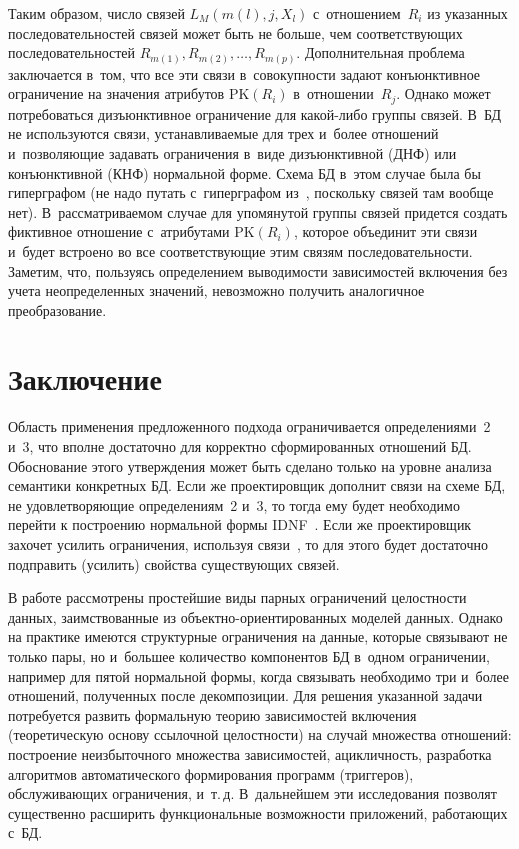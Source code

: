 \begin{multicols}{2}
  Таким образом, число связей $L_M(m(l),j,X_l)$ с~отношением~$R_i$ из
указанных последовательностей связей может быть не больше, чем
соответствующих последовательностей $R_{m(1)}, R_{m(2)}, \ldots, R_{m(p)}$.
Дополнительная проблема заключается в~том, что все эти связи в~совокупности
задают конъюнктивное ограничение на значения атрибутов $\mathrm{PK}(R_i)$ 
в~отношении~$R_j$. Однако может потребоваться дизъюнктивное ограничение
для ка\-кой-ли\-бо \mbox{группы} связей. В~БД не используются связи,
устанавливаемые для трех и~более отношений и~поз\-во\-ля\-ющие задавать
ограничения в~виде дизъюнктивной (ДНФ)
или конъюнктивной  (КНФ) нормальной форме. Схема БД в~этом случае
была бы гиперграфом (не надо путать с~гиперграфом из~\cite{6-z, 9-z},
поскольку связей там вообще нет). В~рассматриваемом случае для упомянутой
группы связей придется создать фиктивное отношение с~атрибутами $\mathrm{PK}(R_i)$,
которое объединит эти связи и~будет встроено во все соответствующие этим
связям последовательности. Заметим, что, пользуясь определением
выводимости зависимостей включения без учета неопределенных значений,
невозможно получить аналогичное преобразование.

\section{Заключение}

  Область применения предложенного подхода ограничивается
определениями~2 и~3, что вполне достаточно для корректно сформированных
отношений БД. Обоснование этого утверждения может быть сделано только на
уровне анализа семантики конкретных БД. Если же проектировщик дополнит
связи на схеме БД, не удовлетворяющие определениям~2 и~3, то тогда ему
будет необходимо перейти к построению нормальной формы IDNF~\cite{5-z}.
Если же проектировщик захочет усилить ограничения, используя
  связи~\cite{8-z}, то для этого будет достаточно подправить (усилить)
свойства существующих связей.

  В работе рассмотрены простейшие виды парных ограничений целостности
данных, заимствованные из объектно-ориентированных моделей данных.
Однако на практике имеются структурные ограничения на данные, которые
связывают не только пары, но и~большее количество компонентов БД в~одном
ограничении, например для пятой нормальной формы, когда связывать
необходимо три и~более отношений, полученных после декомпозиции. Для
решения указанной задачи потребуется развить формальную теорию
зависимостей включения (теоретическую основу ссылочной целостности) на
случай множества отношений: построение неизбыточного множества
зависимостей, ацикличность, разработка алгоритмов автоматического
формирования программ (триггеров), обслуживающих ограничения, и~т.\,д.
В~дальнейшем эти исследования позволят существенно расширить
функциональные возможности приложений, работающих с~БД.


\end{multicols}
